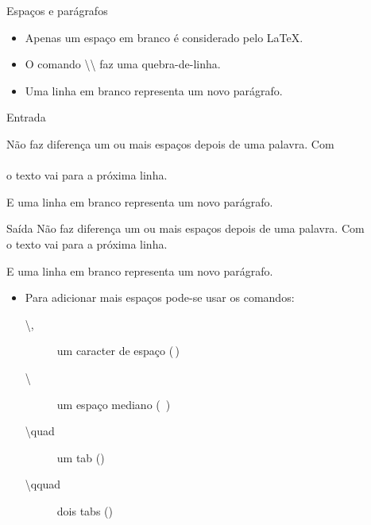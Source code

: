 \begin{frame}{Espaços e parágrafos}
	\begin{itemize}
	\item Apenas um espaço em branco é considerado pelo \LaTeX.
	\item O comando \alert{\textbackslash\textbackslash} faz uma quebra-de-linha.
	\item Uma linha em branco representa um novo parágrafo.
	\end{itemize}

    \begin{block}{Entrada}
        \small
        \begin{semiverbatim}
\small{}Não faz diferença um ou mais        espaços depois de uma
palavra. Com \\\\ o texto vai para a próxima linha.

E uma linha em branco representa um novo parágrafo.
\end{semiverbatim}
    \end{block}    
    
    \begin{block}{Saída}
        \small
        Não faz diferença um ou mais       espaços depois de uma palavra. Com \\ o texto vai para a próxima linha.

        E uma linha em branco representa um novo parágrafo.
    \end{block}
    
    \begin{itemize}
    \item Para adicionar mais espaços pode-se usar os comandos:
        \begin{description}
        \item[\textbackslash ,] um caracter de espaço (\,)
        \item[\textbackslash \textvisiblespace] um espaço mediano (\ )
        \item[\textbackslash quad] um tab (\quad)
        \item[\textbackslash qquad] dois tabs (\qquad)
        \end{description}
    \end{itemize}
\end{frame}

